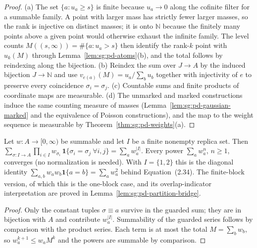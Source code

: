 \begin{proof}
  \leanok
(a) The set $\{a:u_a\ge s\}$ is finite because $u_a\to0$ along the cofinite filter for a summable family. A point with larger mass has strictly fewer larger masses, so the rank is injective on distinct masses; it is onto $\mathbb N$ because the finitely many points above a given point would otherwise exhaust the infinite family. The level counts $M((s,\infty))=\#\{a:u_a>s\}$ then identify the rank-$k$ point with $u_k(M)$ through Lemma~\ref{lem:sg:pd-atoms}(b), and the total follows by reindexing along the bijection. (b) Reindex the sum over $J\to A$ by the induced bijection $J\to\mathbb N$ and use $v_{e(a)}(M)=u_a/\sum_bu_b$ together with injectivity of $e$ to preserve every coincidence $\sigma_i=\sigma_j$. (c) Countable sums and finite products of coordinate maps are measurable. (d) The unmarked and marked constructions induce the same counting measure of masses (Lemma~\ref{lem:sg:pd-gaussian-marked} and the equivalence of Poisson constructions), and the map to the weight sequence is measurable by Theorem~\ref{thm:sg:pd-weights}(a).
\end{proof}

\begin{lemma}\label{lem:sg:pd-power-sum-bridge}
  \leanok
Let $w:A\to[0,\infty)$ be summable and let $I$ be a finite nonempty replica set. Then $\sum_{\sigma:I\to A}\prod_{i\in I}w_{\sigma_i}\,\mathbf 1\{\sigma_i=\sigma_j\ \forall i,j\}=\sum_{a}w_a^{|I|}$. Every power $\sum_aw_a^n$, $n\ge1$, converges (no normalization is needed). With $I=\{1,2\}$ this is the diagonal identity $\sum_{a,b}w_aw_b\mathbf 1\{a=b\}=\sum_aw_a^2$ behind Equation~(2.34). The finite-block version, of which this is the one-block case, and its overlap-indicator interpretation are proved in Lemma~\ref{lem:sg:pd-partition-bridge}.
\end{lemma}
\begin{proof}
  \leanok
Only the constant tuples $\sigma\equiv a$ survive in the guarded sum; they are in bijection with $A$ and contribute $w_a^{|I|}$. Summability of the guarded series follows by comparison with the product series. Each term is at most the total $M=\sum_bw_b$, so $w_a^{k+1}\le w_a M^k$ and the powers are summable by comparison.
\end{proof}

